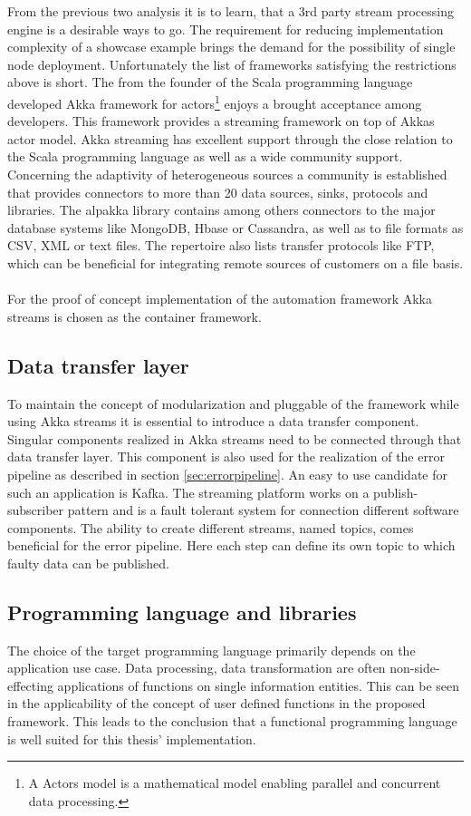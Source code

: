 \noindent From the previous two analysis it is to learn, that a 3rd party stream processing engine is a desirable ways to go. The requirement for reducing implementation complexity of a showcase example brings the demand for the possibility of single node deployment. Unfortunately the list of frameworks satisfying the restrictions above is short. The from the founder of the Scala programming language developed Akka framework for actors\footnote{A Actors model is a mathematical model enabling parallel and concurrent data processing.} enjoys a brought acceptance among developers. This framework provides a streaming framework on top of Akkas actor model. Akka streaming has excellent support through the close relation to the Scala programming language as well as a wide community support. Concerning the adaptivity of heterogeneous sources a community is established that provides connectors to more than 20 data sources, sinks, protocols and libraries. The alpakka library contains among others connectors to the major database systems like MongoDB, Hbase or Cassandra, as well as to file formats as CSV, XML or text files. The repertoire also lists transfer protocols like FTP, which can be beneficial for integrating remote sources of customers on a file basis.
\\\\
For the proof of concept implementation of the automation framework Akka streams is chosen as the container framework. 

\subsection{Data transfer layer}
To maintain the concept of modularization and pluggable of the framework while using Akka streams it is essential to introduce a data transfer component. Singular components realized in Akka streams need to be connected through that data transfer layer. This component is also used for the realization of the error pipeline as described in section \ref{sec:errorpipeline}. An easy to use candidate for such an application is Kafka. The streaming platform works on a publish-subscriber pattern and is a fault tolerant system for connection different software components. The ability to create different streams, named topics, comes beneficial for the error pipeline. Here each step can define its own topic to which faulty data can be published.

\subsection{Programming language and libraries}
The choice of the target programming language primarily depends on the application use case. Data processing, data transformation are often non-side-effecting applications of functions on single information entities. This can be seen in the applicability of the concept of user defined functions in the proposed framework. This leads to the conclusion that a functional programming language is well suited for this thesis' implementation. 

